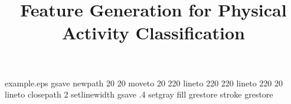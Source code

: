%
%
%
%
%

\begin{filecontents*}{example.eps}
gsave
newpath
  20 20 moveto
  20 220 lineto
  220 220 lineto
  220 20 lineto
closepath
2 setlinewidth
gsave
  .4 setgray fill
grestore
stroke
grestore
\end{filecontents*}
%
\RequirePackage{fix-cm}
%
\documentclass[smallextended]{svjour3}       %
%
\smartqed  %
%
\usepackage{graphicx}

\usepackage{amssymb, mathtools, bm}
\usepackage{subfig}
\usepackage{color} 
\captionsetup[figure]{labelfont=bf,textfont=normal, labelsep=space}
\captionsetup[table]{labelfont=bf,textfont=normal, labelsep=space}

\DeclareMathOperator{\sgn}{\mathop{sgn}}
\DeclareMathOperator*{\argmin}{arg\,min}
\newcommand{\T}{{\mbox{\scriptsize\sffamily\upshape\mdseries T}}}
%
%
%
%
%


\title{Feature Generation for Physical Activity Classification%
}

